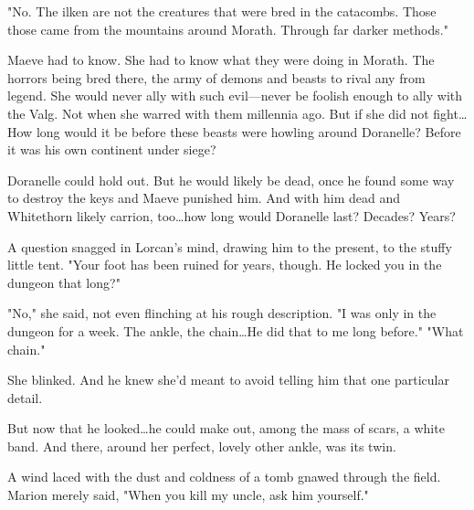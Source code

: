 "No.
The ilken are not the creatures that were bred in the catacombs.
Those  those came from the mountains around Morath.
Through far darker methods."

Maeve had to know.
She had to know what they were doing in Morath.
The horrors being bred there, the army of demons and beasts to rival any from legend.
She would never ally with such evil---never be foolish enough to ally with the Valg.
Not when she warred with them millennia ago.
But if she did not fight\ldots How long would it be before these beasts were howling around Doranelle?
Before it was his own continent under siege?

Doranelle could hold out.
But he would likely be dead, once he found some way to destroy the keys and Maeve punished him.
And with him dead and Whitethorn likely carrion, too\ldots how long would Doranelle last?
Decades?
Years?

A question snagged in Lorcan's mind, drawing him to the present, to the stuffy little tent.
"Your foot has been ruined for years, though.
He locked you in the dungeon that long?"

"No," she said, not even flinching at his rough description.
"I was only in the dungeon for a week.
The ankle, the chain\ldots He did that to me long before."
"What chain."

She blinked.
And he knew she'd meant to avoid telling him that one particular detail.

But now that he looked\ldots he could make out, among the mass of scars, a white band.
And there, around her perfect, lovely other ankle, was its twin.

A wind laced with the dust and coldness of a tomb gnawed through the field.
Marion merely said, "When you kill my uncle, ask him yourself."
